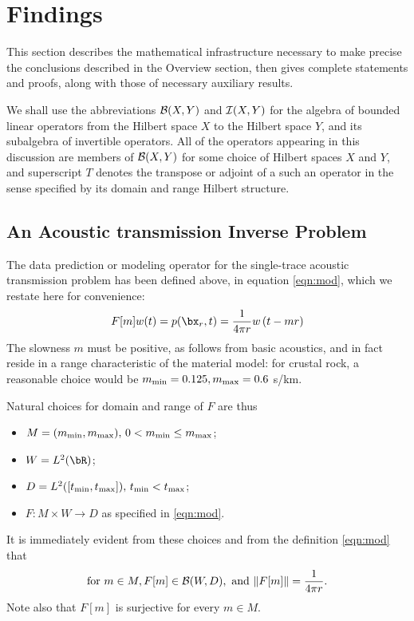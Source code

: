 \section{Findings}
This section describes the mathematical infrastructure necessary to
make precise the conclusions described in the Overview section, then
gives complete statements and proofs, along with those of
necessary auxiliary results. 

We shall use the abbreviations ${\cal B}(X,Y)$ and ${\cal I}(X,Y)$ for 
the algebra of bounded linear operators from the Hilbert space $X$ to 
the Hilbert space $Y$, and its subalgebra of invertible
operators. All of the operators appearing in this discussion are
members of ${\cal B}(X,Y)$ for some choice of Hilbert spaces $X$ and
$Y$, and superscript $T$ denotes the transpose or adjoint of a such an
operator in the sense specified by its domain and range Hilbert structure.

\subsection{An Acoustic transmission Inverse Problem}
The data prediction or modeling operator for the single-trace acoustic
transmission problem has been defined above, in equation
\ref{eqn:mod}, which we restate here for convenience:
\begin{equation}
\label{eqn:mod1}
F[m]w(t)  = p(\bx_r,t) = \frac{1}{4\pi r}w\left(t-mr\right) 
\end{equation}
The slowness $m$ must be positive, as follows from basic acoustics,
and in fact reside in a range characteristic of the
material model: for crustal rock, a reasonable choice would be
$m_{\rm min}=0.125, m_{\rm max}=0.6$ s/km.

Natural choices for domain and
range of $F$ are thus
\begin{itemize}
\item $M=(m_{\rm min}, m_{\rm max}),\,0 < m_{\rm min} \le m_{\rm
    max}$;
\item $W = L^2(\bR)$;
\item $D=L^2([t_{\rm min},t_{\rm max}]),\, t_{\rm min}<t_{\rm max}$;
\item $F: M \times W \rightarrow D$ as specified in \ref{eqn:mod}.
\end{itemize}
It is immediately evident from these choices and from the definition
\ref{eqn:mod} that
\begin{equation}
  \label{eqn:mapprop}
  \mbox{for }m \in M, F[m] \in {\cal B}(W,D),\mbox{ and }\|F[m]\| =
  \frac{1}{4\pi r}.
\end{equation}
Note also that $F[m]$ is surjective for every $m \in M$.

